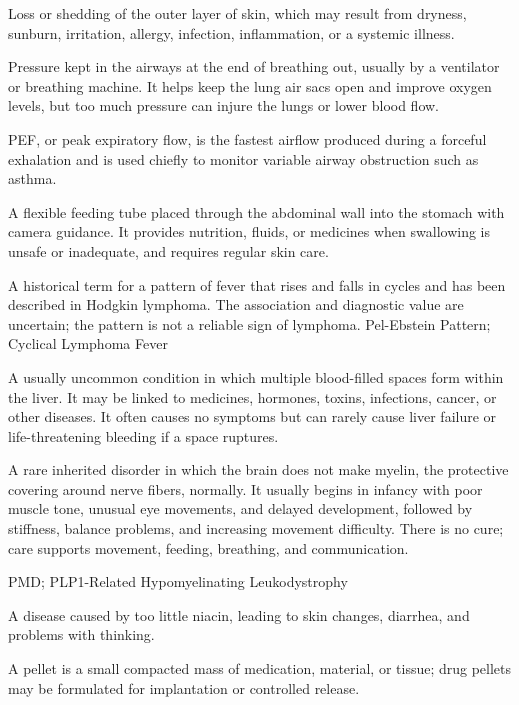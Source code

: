  Loss or shedding of the outer layer of skin, which may result from dryness, sunburn, irritation, allergy, infection, inflammation, or a systemic illness.

 Pressure kept in the airways at the end of breathing out, usually by a ventilator or breathing machine. It helps keep the lung air sacs open and improve oxygen levels, but too much pressure can injure the lungs or lower blood flow.

 PEF, or peak expiratory flow, is the fastest airflow produced during a forceful exhalation and is used chiefly to monitor variable airway obstruction such as asthma.

 A flexible feeding tube placed through the abdominal wall into the stomach with camera guidance. It provides nutrition, fluids, or medicines when swallowing is unsafe or inadequate, and requires regular skin care.

 A historical term for a pattern of fever that rises and falls in cycles and has been described in Hodgkin lymphoma. The association and diagnostic value are uncertain; the pattern is not a reliable sign of lymphoma.
\synonyms
Pel-Ebstein Pattern; Cyclical Lymphoma Fever

 A usually uncommon condition in which multiple blood-filled spaces form within the liver. It may be linked to medicines, hormones, toxins, infections, cancer, or other diseases. It often causes no symptoms but can rarely cause liver failure or life-threatening bleeding if a space ruptures.

 A rare inherited disorder in which the brain does not make myelin, the protective covering around nerve fibers, normally. It usually begins in infancy with poor muscle tone, unusual eye movements, and delayed development, followed by stiffness, balance problems, and increasing movement difficulty. There is no cure; care supports movement, feeding, breathing, and communication.

\synonyms
PMD; PLP1-Related Hypomyelinating Leukodystrophy

 A disease caused by too little niacin, leading to skin changes, diarrhea, and problems with thinking.

 A pellet is a small compacted mass of medication, material, or tissue; drug pellets may be formulated for implantation or controlled release.

